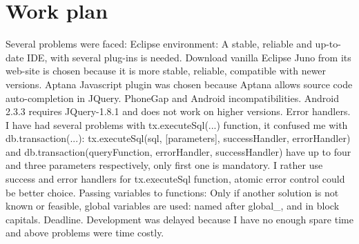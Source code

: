 \section {Work plan}

Several problems were faced:
Eclipse environment: A stable, reliable and up-to-date IDE, with several plug-ins is needed. Download vanilla Eclipse Juno from its web-site is chosen because it is more stable, reliable, compatible with newer versions.  Aptana Javascript plugin was chosen because Aptana allows source code auto-completion in JQuery.
PhoneGap and Android incompatibilities. Android 2.3.3 requires JQuery-1.8.1 and does not work on higher versions. 
Error handlers. I have had several problems with tx.executeSql(...) function, it confused me with db.transaction(...): 
tx.executeSql(sql, [parameters],  successHandler, errorHandler)
and
db.transaction(queryFunction, errorHandler, successHandler)  
have up to four and three parameters respectively, only first one is mandatory. I rather use success and error handlers for tx.executeSql function, atomic error control could be better choice.
Passing variables to functions: Only if another solution is not known or feasible, global variables are used: named after global\_\*, and in block capitals.
Deadline. Development was delayed because I have no enough spare time and above problems were time costly.

